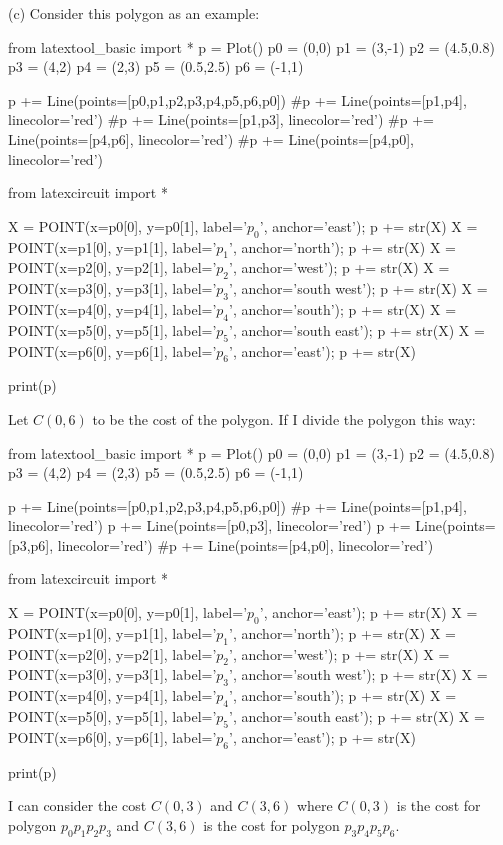 (c)
Consider this polygon as an example:
\begin{python}
from latextool_basic import *
p = Plot()
p0 = (0,0)
p1 = (3,-1)
p2 = (4.5,0.8)
p3 = (4,2)
p4 = (2,3)
p5 = (0.5,2.5)
p6 = (-1,1)

p += Line(points=[p0,p1,p2,p3,p4,p5,p6,p0])
#p += Line(points=[p1,p4], linecolor='red')
#p += Line(points=[p1,p3], linecolor='red')
#p += Line(points=[p4,p6], linecolor='red')
#p += Line(points=[p4,p0], linecolor='red')

from latexcircuit import *

X = POINT(x=p0[0], y=p0[1], label='$p_0$', anchor='east'); p += str(X)
X = POINT(x=p1[0], y=p1[1], label='$p_1$', anchor='north'); p += str(X)
X = POINT(x=p2[0], y=p2[1], label='$p_2$', anchor='west'); p += str(X)
X = POINT(x=p3[0], y=p3[1], label='$p_3$', anchor='south west'); p += str(X)
X = POINT(x=p4[0], y=p4[1], label='$p_4$', anchor='south'); p += str(X)
X = POINT(x=p5[0], y=p5[1], label='$p_5$', anchor='south east'); p += str(X)
X = POINT(x=p6[0], y=p6[1], label='$p_6$', anchor='east'); p += str(X)

print(p)
\end{python}
Let $C(0, 6)$ to be the cost of the polygon.
If I divide the polygon this way:
\begin{python}
from latextool_basic import *
p = Plot()
p0 = (0,0)
p1 = (3,-1)
p2 = (4.5,0.8)
p3 = (4,2)
p4 = (2,3)
p5 = (0.5,2.5)
p6 = (-1,1)

p += Line(points=[p0,p1,p2,p3,p4,p5,p6,p0])
#p += Line(points=[p1,p4], linecolor='red')
p += Line(points=[p0,p3], linecolor='red')
p += Line(points=[p3,p6], linecolor='red')
#p += Line(points=[p4,p0], linecolor='red')

from latexcircuit import *

X = POINT(x=p0[0], y=p0[1], label='$p_0$', anchor='east'); p += str(X)
X = POINT(x=p1[0], y=p1[1], label='$p_1$', anchor='north'); p += str(X)
X = POINT(x=p2[0], y=p2[1], label='$p_2$', anchor='west'); p += str(X)
X = POINT(x=p3[0], y=p3[1], label='$p_3$', anchor='south west'); p += str(X)
X = POINT(x=p4[0], y=p4[1], label='$p_4$', anchor='south'); p += str(X)
X = POINT(x=p5[0], y=p5[1], label='$p_5$', anchor='south east'); p += str(X)
X = POINT(x=p6[0], y=p6[1], label='$p_6$', anchor='east'); p += str(X)

print(p)
\end{python}
I can consider the cost $C(0, 3)$ and $C(3, 6)$
where
$C(0, 3)$ is the cost for polygon $p_0 p_1 p_2 p_3$
and 
$C(3, 6)$ is the cost for polygon $p_3 p_4 p_5 p_6$.



